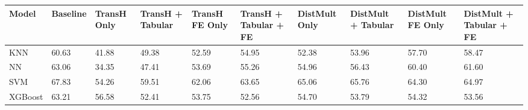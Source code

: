 \begin{tabular}{llllllllll}
\toprule
Model & Baseline & TransH Only & TransH + Tabular & TransH FE Only & TransH + Tabular + FE & DistMult Only & DistMult + Tabular & DistMult FE Only & DistMult + Tabular + FE \\
\midrule
KNN & 60.63 & 41.88 & 49.38 & 52.59 & 54.95 & 52.38 & 53.96 & 57.70 & 58.47 \\
NN & 63.06 & 34.35 & 47.41 & 53.69 & 55.26 & 54.96 & 56.43 & 60.40 & 61.60 \\
SVM & 67.83 & 54.26 & 59.51 & 62.06 & 63.65 & 65.06 & 65.76 & 64.30 & 64.97 \\
XGBoost & 63.21 & 56.58 & 52.41 & 53.75 & 52.56 & 54.70 & 53.79 & 54.32 & 53.56 \\
\bottomrule
\end{tabular}
